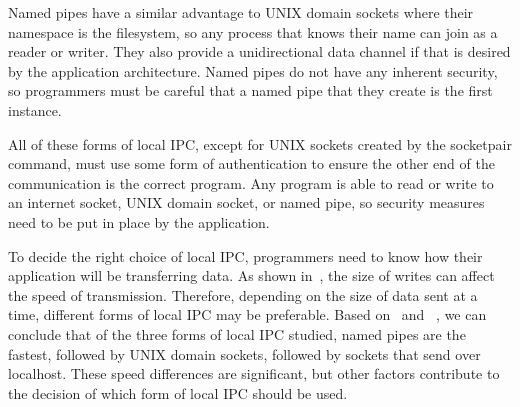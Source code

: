 Named pipes have a similar advantage to UNIX domain sockets where their namespace is the filesystem, so any process that knows their name can join as a reader or writer.  They also provide a unidirectional data channel if that is desired by the application architecture.  Named pipes do not have any inherent security, so programmers must be careful that a named pipe that they create is the first instance.

All of these forms of local IPC, except for UNIX sockets created by the socketpair command, must use some form of authentication to ensure the other end of the communication is the correct program.  Any program is able to read or write to an internet socket, UNIX domain socket, or named pipe, so security measures need to be put in place by the application.

To decide the right choice of local IPC, programmers need to know how their application will be transferring data.  As shown in~\cite{Xiurong2011TheAA}, the size of writes can affect the speed of transmission.  Therefore, depending on the size of data sent at a time, different forms of local IPC may be preferable.  Based on~\cite{immich2003performance} and ~\cite{Stevens:1997:UNP:522800}, we can conclude that of the three forms of local IPC studied, named pipes are the fastest, followed by UNIX domain sockets, followed by sockets that send over localhost.  These speed differences are significant, but other factors contribute to the decision of which form of local IPC should be used.

